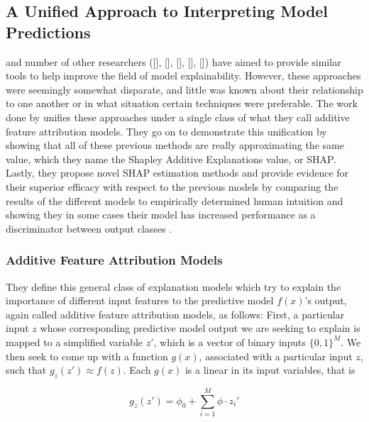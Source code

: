 \subsection{A Unified Approach to Interpreting Model Predictions \citep{microsoftPaper}}
\label{sec:lundberg}

\citet{QII_MS3} and number of other researchers ([], [], [], [], []) have aimed to provide similar tools to help improve the field of model explainability. However, these approaches were seemingly somewhat disparate, and little was known about their relationship to one another or in what situation certain techniques were preferable. The work done by \citet{microsoftPaper} unifies these approaches under a single class of what they call additive feature attribution models. They go on to demonstrate this unification by showing that all of these previous methods are really approximating the same value, which they name the Shapley Additive Explanations value, or SHAP. Lastly, they propose novel SHAP estimation methods and provide evidence for their superior efficacy with respect to the previous models by comparing the results of the different models to empirically determined human intuition and showing they in some cases their model has increased performance as a discriminator between output classes \citep{microsoftPaper}.

\subsubsection{Additive Feature Attribution Models}

They define this general class of explanation models which try to explain the importance of different input features to the predictive model $f(x)$'s output, again called additive feature attribution models, as follows: First, a particular input $z$ whose corresponding predictive model output we are seeking to explain is mapped to a simplified variable $z'$, which is a vector of binary inputs $\{0,1\}^M$. We then seek to come up with a function $g(x)$, associated with a particular input $z$, such that $g_z(z') \approx f(z)$. Each $g(x)$ is a linear in its input variables, that is

\begin{equation}
    g_z(z') = \phi_0 + \sum_{i=1}^M \phi \cdot z_i'
\end{equation}

